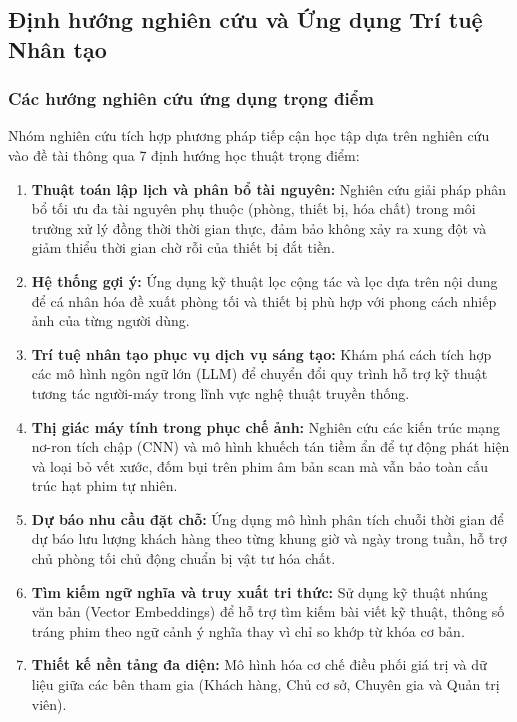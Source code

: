 \subsection{Định hướng nghiên cứu và Ứng dụng Trí tuệ Nhân tạo}

\subsubsection{Các hướng nghiên cứu ứng dụng trọng điểm}
Nhóm nghiên cứu tích hợp phương pháp tiếp cận học tập dựa trên nghiên cứu vào đề tài thông qua 7 định hướng học thuật trọng điểm:
\begin{enumerate}[leftmargin=2em]
    \item \textbf{Thuật toán lập lịch và phân bổ tài nguyên:} Nghiên cứu giải pháp phân bổ tối ưu đa tài nguyên phụ thuộc (phòng, thiết bị, hóa chất) trong môi trường xử lý đồng thời thời gian thực, đảm bảo không xảy ra xung đột và giảm thiểu thời gian chờ rỗi của thiết bị đắt tiền.
    \item \textbf{Hệ thống gợi ý:} Ứng dụng kỹ thuật lọc cộng tác và lọc dựa trên nội dung để cá nhân hóa đề xuất phòng tối và thiết bị phù hợp với phong cách nhiếp ảnh của từng người dùng.
    \item \textbf{Trí tuệ nhân tạo phục vụ dịch vụ sáng tạo:} Khám phá cách tích hợp các mô hình ngôn ngữ lớn (LLM) để chuyển đổi quy trình hỗ trợ kỹ thuật tương tác người-máy trong lĩnh vực nghệ thuật truyền thống.
    \item \textbf{Thị giác máy tính trong phục chế ảnh:} Nghiên cứu các kiến trúc mạng nơ-ron tích chập (CNN) và mô hình khuếch tán tiềm ẩn để tự động phát hiện và loại bỏ vết xước, đốm bụi trên phim âm bản scan mà vẫn bảo toàn cấu trúc hạt phim tự nhiên.
    \item \textbf{Dự báo nhu cầu đặt chỗ:} Ứng dụng mô hình phân tích chuỗi thời gian để dự báo lưu lượng khách hàng theo từng khung giờ và ngày trong tuần, hỗ trợ chủ phòng tối chủ động chuẩn bị vật tư hóa chất.
    \item \textbf{Tìm kiếm ngữ nghĩa và truy xuất tri thức:} Sử dụng kỹ thuật nhúng văn bản (Vector Embeddings) để hỗ trợ tìm kiếm bài viết kỹ thuật, thông số tráng phim theo ngữ cảnh ý nghĩa thay vì chỉ so khớp từ khóa cơ bản.
    \item \textbf{Thiết kế nền tảng đa diện:} Mô hình hóa cơ chế điều phối giá trị và dữ liệu giữa các bên tham gia (Khách hàng, Chủ cơ sở, Chuyên gia và Quản trị viên).
\end{enumerate}

